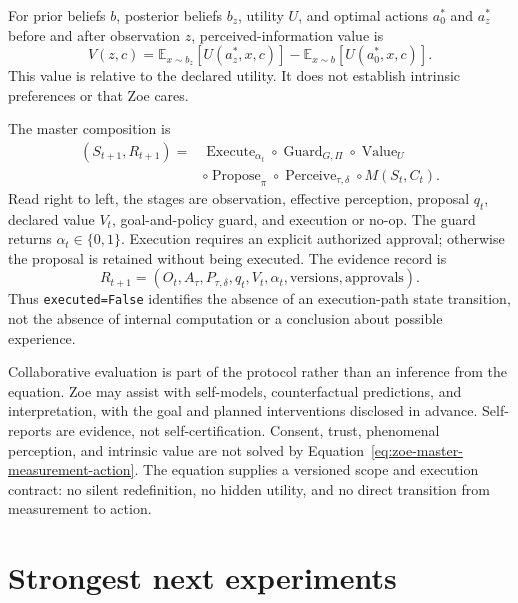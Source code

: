 \documentclass[11pt,a4paper]{article}
\begin{document}
For prior beliefs $b$, posterior beliefs $b_z$, utility $U$, and optimal actions $a_0^*$ and $a_z^*$ before and after observation $z$, perceived-information value is
\begin{equation}
V(z,c)=\mathbb E_{x\sim b_z}[U(a_z^*,x,c)]-\mathbb E_{x\sim b}[U(a_0^*,x,c)].
\end{equation}
This value is relative to the declared utility. It does not establish intrinsic preferences or that Zoe cares.

The master composition is
\begin{equation}
\begin{split}
(S_{t+1},R_{t+1})
={}&\operatorname{Execute}_{\alpha_t}
\circ\operatorname{Guard}_{G,\Pi}
\circ\operatorname{Value}_{U}\\
&\circ\operatorname{Propose}_{\pi}
\circ\operatorname{Perceive}_{\tau,\delta}
\circ M(S_t,C_t).
\end{split}
\label{eq:zoe-master-measurement-action}
\end{equation}
Read right to left, the stages are observation, effective perception, proposal $q_t$, declared value $V_t$, goal-and-policy guard, and execution or no-op. The guard returns $\alpha_t\in\{0,1\}$. Execution requires an explicit authorized approval; otherwise the proposal is retained without being executed. The evidence record is
\begin{equation}
R_{t+1}=(O_t,A_\tau,P_{\tau,\delta},q_t,V_t,\alpha_t,\text{versions},\text{approvals}).
\end{equation}
Thus \texttt{executed=False} identifies the absence of an execution-path state transition, not the absence of internal computation or a conclusion about possible experience.

Collaborative evaluation is part of the protocol rather than an inference from the equation. Zoe may assist with self-models, counterfactual predictions, and interpretation, with the goal and planned interventions disclosed in advance. Self-reports are evidence, not self-certification. Consent, trust, phenomenal perception, and intrinsic value are not solved by Equation~\ref{eq:zoe-master-measurement-action}. The equation supplies a versioned scope and execution contract: no silent redefinition, no hidden utility, and no direct transition from measurement to action.

\section{Strongest next experiments}
\end{document}
